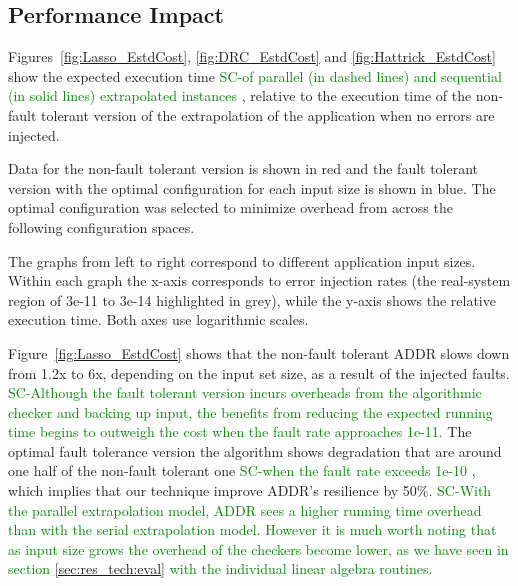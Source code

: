 \documentclass[10pt, conference, compsocconf]{IEEEtran}
\newcommand{\sui}[1]{%
  \textcolor{green}{SC-#1}
}
\begin{document}
\vspace{-10pt}
\subsection{Performance Impact}
\vspace{-10pt}
\label{sec:eval:perf}
Figures~\ref{fig:Lasso_EstdCost}, \ref{fig:DRC_EstdCost} and \ref{fig:Hattrick_EstdCost} show the expected execution time \sui{of parallel (in dashed lines) and sequential (in solid lines) extrapolated instances}, relative to the execution time of the non-fault tolerant version of the extrapolation of the application when no errors are injected.

Data for the non-fault tolerant version is shown in red and the fault tolerant version with the optimal configuration for each input size is shown in blue.
The optimal configuration was selected to minimize overhead from across the following configuration spaces.

The graphs from left to right correspond to different application input sizes. Within each graph the x-axis corresponds to error injection rates (the real-system region of 3e-11 to 3e-14 highlighted in grey), while the y-axis shows the relative execution time. Both axes use logarithmic scales.


Figure~\ref{fig:Lasso_EstdCost} shows that the non-fault tolerant ADDR slows down from 1.2x to 6x, depending on the input set size, as a result of the injected faults.
\sui{Although the fault tolerant version incurs overheads from the algorithmic checker and backing up input, the benefits from reducing the expected running time begins to outweigh the cost when the fault rate approaches 1e-11.} The optimal fault tolerance version the algorithm shows degradation that are around one half of the non-fault tolerant one \sui{when the fault rate exceeds 1e-10}, which implies that our technique improve ADDR's resilience by 50\%.
\sui{With the parallel extrapolation model, ADDR sees a higher running time overhead than with the serial extrapolation model. However it is much worth noting that as input size grows the overhead of the checkers become lower, as we have seen in section \ref{sec:res_tech:eval} with the individual linear algebra routines.}
\end{document}
